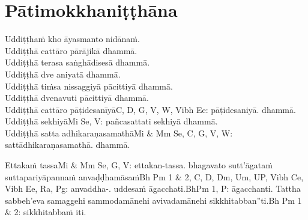 
\section{Pātimokkhaniṭṭhāna}
\label{patimokkhanitthana}

Uddiṭṭhaṁ kho āyasmanto nidānaṁ.\\
Uddiṭṭhā cattāro pārājikā dhammā.\\
Uddiṭṭhā terasa saṅghādisesā dhammā.\\
Uddiṭṭhā dve aniyatā dhammā.\\
Uddiṭṭhā tiṁsa nissaggiyā pācittiyā dhammā.\\
Uddiṭṭhā dvenavuti pācittiyā dhammā.\\
Uddiṭṭhā cattāro pāṭidesanīyā\makeatletter\hyperlink{endnote-appendix}\makeatother C, D, G, V, W, Vibh Ee: pāṭidesaniyā. dhammā.\\
Uddiṭṭhā sekhiyā\makeatletter\hyperlink{endnote-appendix}\makeatother Mi Se, V: pañcasattati sekhiyā dhammā.\\
Uddiṭṭhā satta adhikaraṇasamathā\makeatletter\hyperlink{endnote-appendix}\makeatother Mi & Mm Se, C, G, V, W: sattādhikaraṇasamathā. dhammā.

Ettakaṁ tassa\makeatletter\hyperlink{endnote-appendix}\makeatother Mi & Mm Se, G, V: ettakan-tassa. bhagavato sutt'āgataṁ suttapariyāpannaṁ anvaḍḍhamāsaṁ\makeatletter\hyperlink{endnote-appendix}\makeatother Bh Pm 1 & 2, C, D, Dm, Um, UP, Vibh Ce, Vibh Ee, Ra, Pg: anvaddha-. uddesaṁ āgacchati.\makeatletter\hyperlink{endnote-appendix}\makeatother BhPm 1, P: āgacchanti. Tattha sabbeh'eva samaggehi sammodamānehi avivadamānehi sikkhitabban''ti.\makeatletter\hyperlink{endnote-appendix}\makeatother Bh Pm 1 & 2: sikkhitabbaṁ iti.

